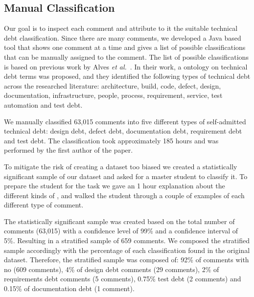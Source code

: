 

\subsection{Manual Classification} %
\label{sub:manual_classification}

Our goal is to inspect each comment and attribute to it the suitable technical debt classification. Since there are many comments, we developed a Java based tool that shows one comment at a time and gives a list of possible classifications that can be manually assigned to the comment. The list of possible classifications is based on previous work by Alves \textit{et al.}~\cite{Alves2014MTD}. In their work, a ontology on technical debt terms was proposed, and they identified the following types of technical debt across the researched literature: architecture, build, code, defect, design, documentation, infrastructure, people, process, requirement, service, test automation and test debt. 

We manually classified 63,015 comments into five different types of self-admitted technical debt: design debt, defect debt, documentation debt, requirement debt and test debt. The classification took approximately 185 hours and was performed by the first author of the paper.  

To mitigate the risk of creating a dataset too biased we created a statistically significant sample of our dataset and asked for a master student to classify it. To prepare the student for the task we gave an 1 hour explanation about the different kinds of \SATD, and walked the student through a couple of examples of each different type of \SATD comment. 

The statistically significant sample was created based on the total number of comments (63,015) with a confidence level of 99\% and a confidence interval of 5\%. Resulting in a stratified sample of 659 comments. We composed the stratified sample accordingly with the percentage of each classification found in the original dataset. Therefore, the stratified sample was composed of: 92\% of comments with no \SATD (609 comments), 4\% of design debt comments (29 comments), 2\% of requirements debt comments (5 comments), 0.75\% test debt (2 comments) and 0.15\% of documentation debt (1 comment).

